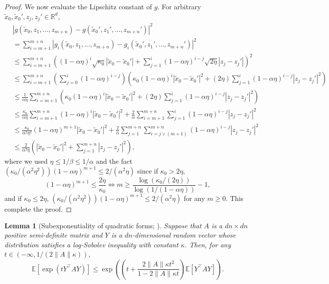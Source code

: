 \documentclass[12pt,reqno]{amsart}
\newtheorem{lemma}[theorem]{Lemma}
\theoremstyle{remark}
\theoremstyle{definition}
\newcommand{\R}{\mathbb{R}}
\newcommand{\E}{\mathbb{E}}
\newcommand{\tx}{\tilde{x}}
\begin{document}
\begin{proof}
We now evaluate the Lipschitz constant of $g$.
For arbitrary $\tx_{0},\tx_{0}',z_{j},z_{j}'\in\R^{d}$,
\begin{align*}
    &|g(\tx_{0},z_{1},\ldots,z_{m+n})-g(\tx_{0}',z_{1}',\ldots,z_{m+n}')|^{2}\\
    &=\sum_{i=m+1}^{m+n}|g_{i}(\tx_{0},z_{1},\ldots,z_{m+n})-g_{i}(\tx_{0}',z_{1}',\ldots,z_{m+n}')|^{2}\\
    &\le \sum_{i=m+1}^{m+n}\left((1-\alpha\eta)^{i}\sqrt{\kappa_{0}}|\tx_{0}-\tx_{0}'|+\sum_{j=1}^{i}(1-\alpha\eta)^{i-j}\sqrt{2\eta}|z_{j}-z_{j}'|\right)^{2}
    \\
    &\le \sum_{i=m+1}^{m+n}\left(\sum_{j=0}^{i}(1-\alpha\eta)^{i-j}\right)\left(\kappa_{0}(1-\alpha\eta)^{i}|\tx_{0}-\tx_{0}'|^{2}+(2\eta)\sum_{j=1}^{i}(1-\alpha\eta)^{i-j}|z_{j}-z_{j}'|^{2}\right)\\
    &\le \frac{1}{\alpha\eta}\sum_{i=m+1}^{m+n}\left(\kappa_{0}(1-\alpha\eta)^{i}|\tx_{0}-\tx_{0}'|^{2}+(2\eta)\sum_{j=1}^{i}(1-\alpha\eta)^{i-j}|z_{j}-z_{j}'|^{2}\right)\\
    &\le \frac{\kappa_{0}}{\alpha\eta}\sum_{i=m+1}^{m+n}(1-\alpha\eta)^{i}|\tx_{0}-\tx_{0}'|^{2}+\frac{2}{\alpha}\sum_{i=m+1}^{m+n}\sum_{j=1}^{i}(1-\alpha\eta)^{i-j}|z_{j}-z_{j}'|^{2}\\
    &\le \frac{\kappa_{0}}{\alpha^{2}\eta^{2}}(1-\alpha\eta)^{m+1}|\tx_{0}-\tx_{0}'|^{2}+\frac{2}{\alpha}\sum_{j=1}^{m+n}\sum_{i=j\vee(m+1)}^{m+n}(1-\alpha\eta)^{i-j}|z_{j}-z_{j}'|^{2}\\
    &\le \frac{2}{\alpha^{2}\eta}\left(|\tx_{0}-\tx_{0}'|^{2}+\sum_{j=1}^{m+n}|z_{j}-z_{j}'|^{2}\right),
\end{align*}
where we used $\eta\le 1/\beta\le 1/\alpha$ and the fact $(\kappa_{0}/(\alpha^{2}\eta^{2}))(1-\alpha\eta)^{m+1}\le 2/(\alpha^{2}\eta)$ since if $\kappa_{0}>2\eta$,
\begin{equation*}
    (1-\alpha\eta)^{m+1}\le \frac{2\eta}{\kappa_{0}}\iff m\ge \frac{\log(\kappa_{0}/(2\eta))}{\log(1/(1-\alpha\eta))}-1,
\end{equation*}
and if $\kappa_{0}\le 2\eta$, $(\kappa_{0}/(\alpha^{2}\eta^{2}))(1-\alpha\eta)^{m+1}\le 2/(\alpha^{2}\eta)$ for any $m\ge0$.
This complete the proof.
\end{proof}

\begin{lemma}[Subexponentiality of quadratic forms; \citealp{nakakita2025corrigendum}]\label{lem:nai25}
    Suppose that $A$ is a $dn\times dn $ positive semi-definite matrix and $Y$ is a $dn$-dimensional random vector whose distribution satisfies a log-Sobolev inequality with constant $\kappa$. Then, for any $t\in(-\infty,1/(2\|A\|\kappa))$,
    \begin{equation*}
        \E\left[\exp\left(tY^{\top}AY\right)\right]\le \exp\left(\left(t+\frac{2\|A\|\kappa t^{2}}{1-2\|A\|\kappa t}\right)\E[Y^{\top}AY]\right).
    \end{equation*}
\end{lemma}
\end{document}
